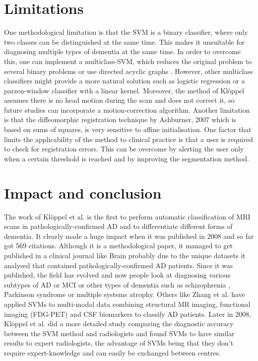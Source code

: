\documentclass[11pt,a4paper,oneside]{report}
\begin{document}
\section*{Limitations}

One methodological limitation is that the SVM is a binary classifier, where only two classes can be distinguished at the same time. This makes it unsuitable for diagnosing multiple types of dementia at the same time. In order to overcome this, one can implement a multiclass-SVM, which reduces the original problem to several binary problems \cite{duan2005best} or use directed acyclic graphs \cite{platt1999large}. However, other multiclass classifiers might provide a more natural solution such as logistic regression \cite{desikan2009automated} or a parzen-window classifier with a linear kernel. \cite{shawe2004kernel} Moreover, the method of Kl\"{o}ppel \cite{kloppel2008automatic} assumes there is no head motion during the scan and does not correct it, so future studies can incorporate a motion-correction algorithm. Another limitation is that the diffeomorphic registration technique by Ashburner, 2007 \cite{ashburner2007fast} which is based on sums of squares, is very sensitive to affine initialisation. \cite{avants2011reproducible} One factor that limits the applicability of the method to clinical practice is that a user is required to check for registration errors. This can be overcome by alerting the user only when a certain threshold is reached and by improving the segmentation method.

\section*{Impact and conclusion}

The work of Kl\"{o}ppel et al. \cite{kloppel2008automatic} is the first to perform automatic classification of MRI scans in pathologically-confirmed AD and to differentiate different forms of dementia. It clearly made a huge impact when it was published in 2008 and so far got 569 citations. Although it is a methodological paper, it managed to get published in a clinical journal like Brain probably due to the unique datasets it analysed that contained pathologically-confirmed AD patients. Since it was published, the field has evolved and now people look at diagnosing various subtypes of AD or MCI \cite{haller2013individual} or other types of dementia such as schizophrenia \cite{ardekani2011diffusion}, Parkinson syndrome \cite{focke2011individual} or multiple systems atrophy. \cite{focke2011individual} Others like Zhang et al. \cite{zhang2011multimodal} have applied SVMs to multi-modal data combining structural MR imaging, functional imaging (FDG-PET) and CSF biomarkers to classify AD patients. Later in 2008, Kl\"{o}ppel et al. \cite{kloppel2008accuracy} did a more detailed study comparing the diagnostic accuracy between the SVM method and radiologists and found SVMs to have similar results to expert radiologists, the advantage of SVMs being that they don't require expert-knowledge and can easily be exchanged between centres.
\end{document}
